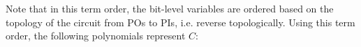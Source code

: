 \begin{Example}
{Note that in this term order, the bit-level variables are ordered
based on the topology of the circuit from POs to PIs, i.e. reverse
topologically. Using this term order, the following polynomials
represent $C$:
}
\end{Example}
